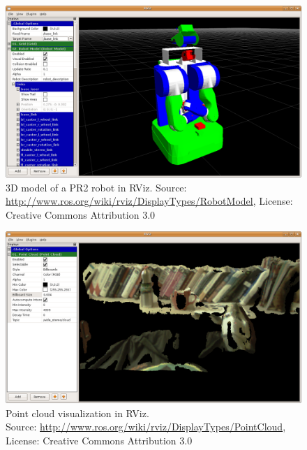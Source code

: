 \begin{figure}[htbp]
  \centering
  \includegraphics[scale=0.3]{img/RVizRobotModel.png}
  \caption{3D model of a PR2 robot in RViz. Source: \url{http://www.ros.org/wiki/rviz/DisplayTypes/RobotModel}, License: Creative Commons Attribution 3.0}
  \label{rviz_model}
\end{figure}

\begin{figure}[htbp]
  \centering
  \includegraphics[scale=0.3]{img/RVizPointCloud.png}
  \caption{Point cloud visualization in RViz.\\Source: \url{http://www.ros.org/wiki/rviz/DisplayTypes/PointCloud}, License: Creative Commons Attribution 3.0}
  \label{rviz_pcl}
\end{figure}


